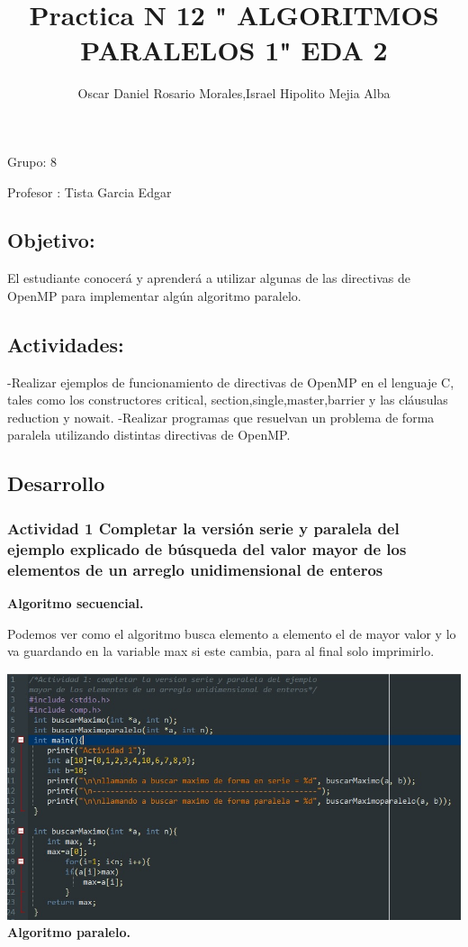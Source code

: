 \documentclass[12pt,letterpaper]{article}
\author{Oscar Daniel Rosario Morales,Israel Hipolito Mejia 
Alba}
\title{Practica N 12 " ALGORITMOS PARALELOS 1" 
EDA 2}
\begin{document}
\maketitle
Grupo: 8 


Profesor : Tista Garcia Edgar

\newpage
\subsection{Objetivo:}
El estudiante conocerá y aprenderá a utilizar algunas de las directivas de OpenMP para implementar algún algoritmo paralelo.

\subsection{Actividades:}
-Realizar ejemplos de funcionamiento de directivas de OpenMP en el lenguaje C, tales como los constructores critical, section,single,master,barrier y las cláusulas reduction y nowait.
-Realizar programas que resuelvan un problema de forma paralela utilizando distintas directivas de OpenMP.
\subsection{Desarrollo}
\subsubsection*{Actividad 1 Completar la versión serie y paralela del ejemplo explicado de búsqueda del valor mayor de los elementos de un arreglo unidimensional de enteros}
\textbf{Algoritmo secuencial.}

Podemos ver como el algoritmo busca elemento a elemento el de mayor valor y lo va guardando en la variable max si este cambia, para al final solo imprimirlo.

\includegraphics[scale=.8]{12-1-1.jpg} 
\textbf{Algoritmo paralelo.}
\end{document}
